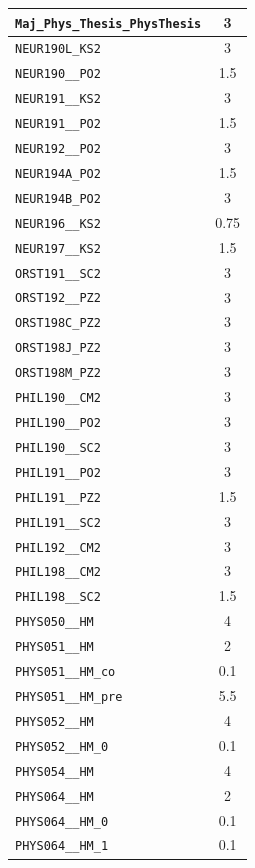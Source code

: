 \begin{longtable}{|p{}|c|}
    \verb|Maj_Phys_Thesis_PhysThesis| & 3\\\hline
    \verb|NEUR190L_KS2| & 3\\\hline
    \verb|NEUR190__PO2| & 1.5\\\hline
    \verb|NEUR191__KS2| & 3\\\hline
    \verb|NEUR191__PO2| & 1.5\\\hline
    \verb|NEUR192__PO2| & 3\\\hline
    \verb|NEUR194A_PO2| & 1.5\\\hline
    \verb|NEUR194B_PO2| & 3\\\hline
    \verb|NEUR196__KS2| & 0.75\\\hline
    \verb|NEUR197__KS2| & 1.5\\\hline
    \verb|ORST191__SC2| & 3\\\hline
    \verb|ORST192__PZ2| & 3\\\hline
    \verb|ORST198C_PZ2| & 3\\\hline
    \verb|ORST198J_PZ2| & 3\\\hline
    \verb|ORST198M_PZ2| & 3\\\hline
    \verb|PHIL190__CM2| & 3\\\hline
    \verb|PHIL190__PO2| & 3\\\hline
    \verb|PHIL190__SC2| & 3\\\hline
    \verb|PHIL191__PO2| & 3\\\hline
    \verb|PHIL191__PZ2| & 1.5\\\hline
    \verb|PHIL191__SC2| & 3\\\hline
    \verb|PHIL192__CM2| & 3\\\hline
    \verb|PHIL198__CM2| & 3\\\hline
    \verb|PHIL198__SC2| & 1.5\\\hline
    \verb|PHYS050__HM| & 4\\\hline
    \verb|PHYS051__HM| & 2\\\hline
    \verb|PHYS051__HM_co| & 0.1\\\hline
    \verb|PHYS051__HM_pre| & 5.5\\\hline
    \verb|PHYS052__HM| & 4\\\hline
    \verb|PHYS052__HM_0| & 0.1\\\hline
    \verb|PHYS054__HM| & 4\\\hline
    \verb|PHYS064__HM| & 2\\\hline
    \verb|PHYS064__HM_0| & 0.1\\\hline
    \verb|PHYS064__HM_1| & 0.1\\\hline

\end{longtable}
